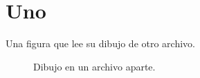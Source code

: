 \section{Uno}

Una figura que lee su dibujo de otro archivo.

\begin{figure}[ht]
  \centering
  \begin{tikzpicture}
    
  \end{tikzpicture}
  \caption{Dibujo en un archivo aparte.}
\end{figure}
